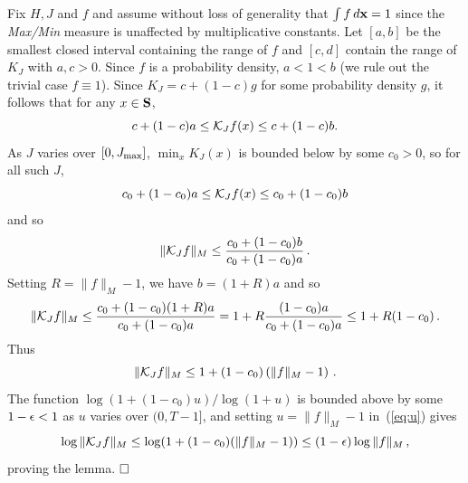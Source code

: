   Fix $H, J$ and $f$ and assume without loss 
of generality that $\int f \, \dx = 1$ since the
{\em Max/Min} measure is unaffected by multiplicative constants.   
Let $[a,b]$ be the smallest closed interval containing the range of $f$
and $[c,d]$ contain the range of $K_J$ with $a,c >0$.
Since $f$ is a probability density,
$a < 1 < b$ (we rule out the trivial case $f \equiv 1$).  Since 
$K_J = c + (1-c) g$ for some probability density $g$, it follows that 
for any $x \in \S$, 
$$c + (1-c) a \leq \KJ f(x) \leq c + (1-c) b .$$
As $J$ varies over $[0 , J_{\rm max}]$, $\min_x K_J (x)$ is bounded 
below by some $c_0 > 0$, so for all such $J$,
$$c_0 + (1-c_0) a \leq \KJ f(x) \leq c_0 + (1-c_0) b$$
and so
$$\| \KJ f \|_M \leq {c_0 + (1 - c_0) b \over c_0 + (1 - c_0) a} \, .$$
Setting $R = \|f\|_M - 1$, we have $b = (1+R) a$ and so 
$$\| \KJ f\|_M \leq {c_0 + (1 - c_0) (1 + R) a \over c_0 + (1 - c_0) a}
   = 1 + R {(1 - c_0) a \over c_0 + (1 - c_0) a}
   \leq 1 + R (1 - c_0) \, .$$
Thus 
\begin{equation} \label{eq:u}
\|\KJ f\|_M \leq 1 + (1 - c_0) \left ( \|f\|_M - 1 \right ) \, .
\end{equation}
The function $\log (1 + (1 - c_0) u) / \log (1 + u)$ is bounded above
by some $1 - \eps < 1$ as $u$ varies over $(0 , T-1]$, and setting
$u = \|f\|_M - 1$ in~(\ref{eq:u}) gives
$$\log \| \KJ f\|_M \leq \log (1 + (1 - c_0) (\|f\|_M - 1)) \leq 
   (1 - \eps) \log \|f\|_M \, ,$$
proving the lemma.  
$\qed$

